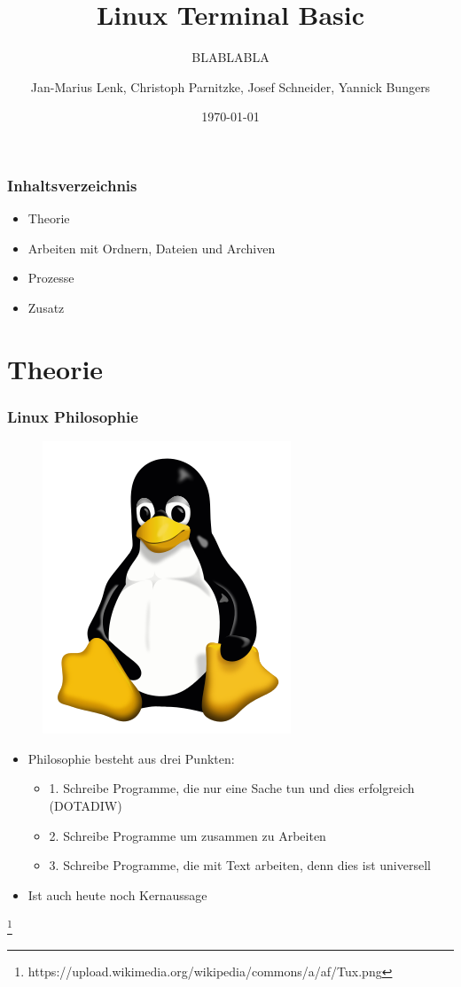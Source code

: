 \documentclass[12pt,utf8]{beamer}
\title{Linux Terminal Basic}
\subtitle{BLABLABLA}
\author[J.-M. Lenk, C. Parnitzke, J. Schneider, Y. Bungers]{Jan-Marius Lenk, Christoph Parnitzke, Josef Schneider, Yannick Bungers}
\institute[FOSS AG]{Free and Open Source Software AG\\ Fakultät für Informatik}
\date{\today}
\begin{document}
\titlepage

\begin{frame}
\frametitle{Inhaltsverzeichnis}
\begin{itemize}
	\item Theorie
	\item Arbeiten mit Ordnern, Dateien und Archiven
	\item Prozesse
	\item Zusatz
\end{itemize}
\end{frame}

\section{Theorie}
\begin{frame}
\frametitle{Linux Philosophie}
\begin{figure}
\includegraphics[scale=0.3]{res/tux.png}
\end{figure}
\begin{itemize}
	\item Philosophie besteht aus drei Punkten:
	\begin{itemize}
		\item 1. Schreibe Programme, die nur eine Sache tun und dies erfolgreich (DOTADIW)
		\item 2. Schreibe Programme um zusammen zu Arbeiten
		\item 3. Schreibe Programme, die mit Text arbeiten, denn dies ist universell
	\end{itemize}
	\item Ist auch heute noch Kernaussage
\end{itemize}
\footnote{https://upload.wikimedia.org/wikipedia/commons/a/af/Tux.png}
\end{frame}
\end{document}
